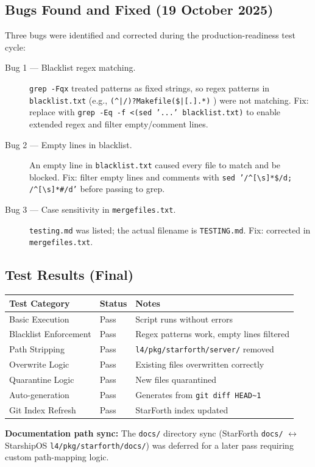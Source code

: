 \subsection{Bugs Found and Fixed (19 October 2025)}

Three bugs were identified and corrected during the production-readiness
test cycle:

\begin{description}
  \item[Bug 1 — Blacklist regex matching.]
        \texttt{grep -Fqx} treated patterns as fixed strings, so regex
        patterns in \texttt{blacklist.txt} (e.g.,
        \texttt{(\textasciicircum|/)?Makefile(\$|[.].*)} )
        were not matching. Fix: replace with \texttt{grep -Eq -f
        <(sed '...' blacklist.txt)} to enable extended regex and filter
        empty/comment lines.

  \item[Bug 2 — Empty lines in blacklist.]
        An empty line in \texttt{blacklist.txt} caused every file to match
        and be blocked. Fix: filter empty lines and comments with
        \texttt{sed '/\textasciicircum[\textbackslash{}s]*\$/d;
        /\textasciicircum[\textbackslash{}s]*\#/d'} before passing to grep.

  \item[Bug 3 — Case sensitivity in \texttt{mergefiles.txt}.]
        \texttt{testing.md} was listed; the actual filename is
        \texttt{TESTING.md}. Fix: corrected in \texttt{mergefiles.txt}.
\end{description}

\subsection{Test Results (Final)}

\begin{center}
\begin{tabular}{lll}
\toprule
Test Category       & Status & Notes \\
\midrule
Basic Execution     & Pass & Script runs without errors \\
Blacklist Enforcement & Pass & Regex patterns work, empty lines filtered \\
Path Stripping      & Pass & \texttt{l4/pkg/starforth/server/} removed \\
Overwrite Logic     & Pass & Existing files overwritten correctly \\
Quarantine Logic    & Pass & New files quarantined \\
Auto-generation     & Pass & Generates from \texttt{git diff HEAD\textasciitilde{}1} \\
Git Index Refresh   & Pass & StarForth index updated \\
\bottomrule
\end{tabular}
\end{center}

\textbf{Documentation path sync:} The \texttt{docs/} directory sync (StarForth
\texttt{docs/} $\leftrightarrow$ StarshipOS
\texttt{l4/pkg/starforth/docs/}) was deferred for a later pass requiring
custom path-mapping logic.
